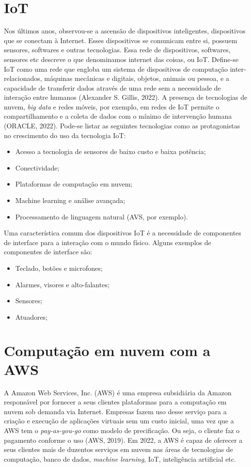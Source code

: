 \documentclass[
    12pt,
    openright,
    twoside,
    a4paper,
    english,
    spanish,
    brazil,
    ]{abntex2}
\begin{document}
\section{IoT}
Nos últimos anos, observou-se a ascensão de dispositivos inteligentes, dispositivos que se conectam à Internet. Esses dispositivos se comunicam entre si, possuem sensores, softwares e outras tecnologias. Essa rede de dispositivos, softwares, sensores etc descreve o que denominamos internet das coisas, ou IoT. Define-se IoT como uma rede que engloba um sistema de dispositivos de computação inter-relacionados, máquinas mecânicas e digitais, objetos, animais ou pessoa, e a capacidade de transferir dados através de uma rede sem a necessidade de interação entre humanos (Alexander S. Gillis, 2022). A presença de tecnologias de nuvem, \textit{big data} e redes móveis, por exemplo, em redes de IoT permite o compartilhamento e a coleta de dados com o mínimo de intervenção humana (ORACLE, 2022). Pode-se listar as seguintes tecnologias como as protagonistas no crescimento do uso da tecnologia IoT:
\begin{itemize}
	\item Acesso a tecnologia de sensores de baixo custo e baixa potência;
	\item Conectividade;
	\item Plataformas de computação em nuvem;
	\item Machine learning e análise avançada;
	\item Processamento de linguagem natural (AVS, por exemplo).
\end{itemize}

Uma característica comum dos dispositivos IoT é a necessidade de componentes de interface para a interação com o mundo físico. Alguns exemplos de componentes de interface são:
\begin{itemize}
	\item Teclado, botões e microfones;
	\item Alarmes, visores e alto-falantes;
	\item Sensores;
	\item Atuadores;
\end{itemize}

\section{Computação em nuvem com a AWS}
A Amazon Web Services, Inc. (AWS) é uma empresa subsidiária da Amazon responsável por fornecer a seus clientes plataformas para a computação em nuvem sob demanda via Internet. Empresas fazem uso desse serviço para a criação e execução de aplicações virtuais sem um custo inicial, uma vez que a AWS tem o \textit{pay-as-you-go} como modelo de precificação. Ou seja, o cliente faz o pagamento conforme o uso (AWS, 2019). Em 2022, a AWS é capaz de oferecer a seus clientes mais de duzentos serviços em nuvem nas áreas de tecnologias de computação, banco de dados, \textit{machine learning}, IoT, inteligência artificial etc.
\end{document}
